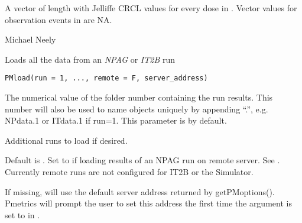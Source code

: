 \documentclass[a4paper]{book}
\begin{document}
%
\begin{Value}
A vector of length  with Jelliffe CRCL values for every dose in . Vector values
for observation events in  are NA.
\end{Value}
%
\begin{Author}\relax
Michael Neely
\end{Author}
%
\begin{Description}\relax
Loads all the data from an \emph{NPAG} or \emph{IT2B} run
\end{Description}
%
\begin{Usage}
\begin{verbatim}
PMload(run = 1, ..., remote = F, server_address)
\end{verbatim}
\end{Usage}
%
\begin{Arguments}
\begin{ldescription}
\item[\code{run}] The numerical value of the folder number containing the run results.  This
number will also be used to name objects uniquely by appending ``.'', 
e.g. NPdata.1 or ITdata.1 if run=1. This parameter is  by default.

\item[\code{...}] Additional runs to load if desired.

\item[\code{remote}] Default is .  Set to  if loading results of an NPAG run on remote server.
See . Currently remote runs are not configured for IT2B or the Simulator.

\item[\code{server\_address}] If missing, will use the default server address returned by getPMoptions(). 
Pmetrics will prompt the user to set this address the first time the  argument is set to 
in .
\end{ldescription}
\end{Arguments}
%
\end{document}
